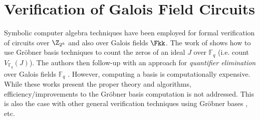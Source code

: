 \section{Verification of Galois Field Circuits}

Symbolic computer algebra techniques have been employed for formal
verification of circuits over $\Z_{2^k}$ and also over
Galois fields $\Fkk$. 
The work of \cite{gao:gf-gb-ms} shows how to use Gr\"obner basis
techniques to count the zeros of an ideal $J$ over ${\mathbb{F}}_q$
(i.e. count $V_{{\mathbb{F}}_q}(J)$). The authors then follow-up with
an approach for {\it quantifier elimination} over Galois fields
${\mathbb{F}}_q$ \cite{gao:qe-gf-gb}. 
However, computing a \Grobner basis is computationally
expensive.
While these works present
the proper theory and algorithms, 
efficiency/improvements to the Gr\"obner
basis computation is not addressed. This is also the case with other
general verification techniques using Gr\"obner bases
\cite{Avrunin:CAV} \cite{gbverify:2007} \cite{manna:program}, etc. 

